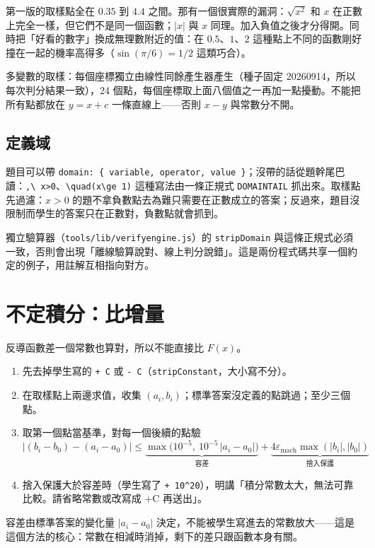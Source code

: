 \documentclass[11pt,a4paper,oneside]{book}
\renewcommand{\_}{\ifmmode\origunderscore\else\textunderscore\allowbreak\fi}
\newcommand{\code}[1]{\texttt{#1}}
\newcommand{\file}[1]{\texttt{\small #1}}
\begin{document}
\begin{pitfall}[全正的取樣點]
第一版的取樣點全在 $0.35$ 到 $4.4$ 之間。那有一個很實際的漏洞：$\sqrt{x^2}$ 和 $x$ 在正數上完全一樣，但它們不是同一個函數；$|x|$ 與 $x$ 同理。加入負值之後才分得開。同時把「好看的數字」換成無理數附近的值：在 $0.5$、$1$、$2$ 這種點上不同的函數剛好撞在一起的機率高得多（$\sin(\pi/6) = 1/2$ 這類巧合）。
\end{pitfall}

多變數的取樣：每個座標獨立由線性同餘產生器產生（種子固定 20260914，所以每次判分結果一致），24 個點，每個座標取上面八個值之一再加一點擾動。不能把所有點都放在 $y = x + c$ 一條直線上——否則 $x - y$ 與常數分不開。

\section{定義域}
題目可以帶 \code{domain: \{ variable, operator, value \}}；沒帶的話從題幹尾巴讀：\code{,\textbackslash\ x>0}、\code{\textbackslash quad(x\textbackslash ge 1)} 這種寫法由一條正規式 \code{DOMAIN\_TAIL} 抓出來。取樣點先過濾：$x > 0$ 的題不拿負數點去為難只需要在正數成立的答案；反過來，題目沒限制而學生的答案只在正數對，負數點就會抓到。

\begin{decision}[線上判分與離線驗算共用同一套定義域語法]
獨立驗算器（\file{tools/lib/verify\_engine.js}）的 \code{stripDomain} 與這條正規式必須一致，否則會出現「離線驗算說對、線上判分說錯」。這是兩份程式碼共享一個約定的例子，用註解互相指向對方。
\end{decision}

\chapter{不定積分：比增量}
反導函數差一個常數也算對，所以不能直接比 $F(x)$。
\begin{enumerate}[label=\arabic*.]
  \item 先去掉學生寫的 \code{+ C} 或 \code{- C}（\code{stripConstant}，大小寫不分）。
  \item 在取樣點上兩邊求值，收集 $(a_i, b_i)$；標準答案沒定義的點跳過；至少三個點。
  \item 取第一個點當基準，對每一個後續的點驗
  \[
    \bigl|(b_i - b_0) - (a_i - a_0)\bigr| \le \underbrace{\max\bigl(10^{-5},\ 10^{-5}\,|a_i - a_0|\bigr)}_{\text{容差}} + \underbrace{4\varepsilon_{\text{mach}}\max(|b_i|,|b_0|)}_{\text{捨入保護}}
  \]
  \item 捨入保護大於容差時（學生寫了 \code{+ 10\string^20}），明講「積分常數太大，無法可靠比較。請省略常數或改寫成 +C 再送出」。
\end{enumerate}
容差由標準答案的變化量 $|a_i - a_0|$ 決定，不能被學生寫進去的常數放大——這是這個方法的核心：常數在相減時消掉，剩下的差只跟函數本身有關。
\end{document}
